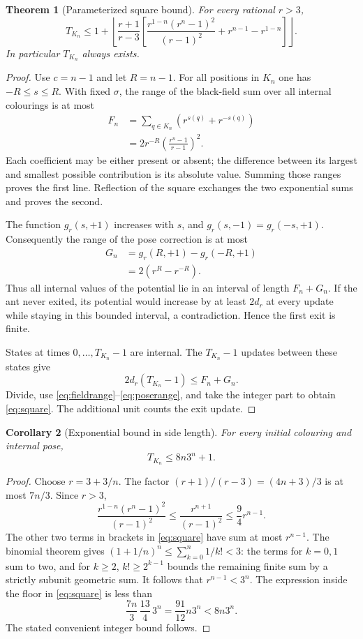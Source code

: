 \documentclass[11pt,a4paper]{article}
\newtheorem{theorem}{Theorem}[section]
\newtheorem{corollary}[theorem]{Corollary}
\theoremstyle{remark}\newtheorem{remark}[theorem]{Remark}
\begin{document}
\begin{theorem}[Parameterized square bound]\label{thm:square}
For every rational $r>3$,
\begin{equation}\label{eq:square}
 T_{K_n}\le1+\left\lfloor\frac{r+1}{r-3}
 \left[\frac{r^{1-n}(r^n-1)^2}{(r-1)^2}
             +r^{n-1}-r^{1-n}\right]\right\rfloor.
\end{equation}
In particular $T_{K_n}$ always exists.
\end{theorem}
\begin{proof}
Use $c=n-1$ and let $R=n-1$. For all positions in $K_n$ one has $-R\le s\le R$.
With fixed $\sigma$, the range of the black-field sum over all internal
colourings is at most
\begin{align}
 F_n&=\sum_{q\in K_n}(r^{s(q)}+r^{-s(q)})\\
 &=2r^{-R}\left(\frac{r^n-1}{r-1}\right)^2.\label{eq:fieldrange}
\end{align}
Each coefficient may be either present or absent; the difference between its
largest and smallest possible contribution is its absolute value. Summing those
ranges proves the first line. Reflection of the square exchanges the two
exponential sums and proves the second.

The function $g_r(s,+1)$ increases with $s$, and
$g_r(s,-1)=g_r(-s,+1)$. Consequently the range of the pose correction is at most
\begin{align}
 G_n&=g_r(R,+1)-g_r(-R,+1)\\
 &=2(r^R-r^{-R}).\label{eq:poserange}
\end{align}
Thus all internal values of the potential lie in an interval of length
$F_n+G_n$. If the ant never exited, its potential would increase by at least
$2d_r$ at every update while staying in this bounded interval, a contradiction.
Hence the first exit is finite.

States at times $0,\ldots,T_{K_n}-1$ are internal. The $T_{K_n}-1$ updates
between these states give
\[
 2d_r(T_{K_n}-1)\le F_n+G_n.
\]
Divide, use \eqref{eq:fieldrange}--\eqref{eq:poserange}, and take the integer
part to obtain \eqref{eq:square}. The additional unit counts the exit update.
\end{proof}

\begin{corollary}[Exponential bound in side length]\label{cor:exp}
For every initial colouring and internal pose,
\[
 \boxed{T_{K_n}\le8n3^n+1.}
\]
\end{corollary}
\begin{proof}
Choose $r=3+3/n$. The factor $(r+1)/(r-3)=(4n+3)/3$ is at most $7n/3$.
Since $r>3$,
\[
 \frac{r^{1-n}(r^n-1)^2}{(r-1)^2}
 \le\frac{r^{n+1}}{(r-1)^2}\le\frac94r^{n-1}.
\]
The other two terms in brackets in \eqref{eq:square} have sum at most $r^{n-1}$.
The binomial theorem gives
$(1+1/n)^n\le\sum_{k=0}^n1/k!<3$: the terms for $k=0,1$ sum to two,
and for $k\ge2$, $k!\ge2^{k-1}$ bounds the remaining finite sum by a
strictly subunit geometric sum. It follows that $r^{n-1}<3^n$. The expression inside the floor
in \eqref{eq:square} is less than
\[
 \frac{7n}{3}\,\frac{13}{4}\,3^n
 =\frac{91}{12}n3^n<8n3^n.
\]
The stated convenient integer bound follows.
\end{proof}
\end{document}
